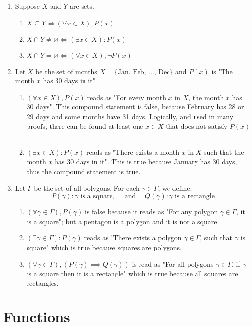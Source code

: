 \begin{example}

    \begin{enumerate}
        \item Suppose $X$ and $Y$ are sets.
            \begin{enumerate}[label=(\alph*)]
                \item $X \subseteq Y \iff (\forall x \in X), P(x)$
                \item $X \cap Y \neq \varnothing \iff (\exists x \in X): P(x)$
                \item $X \cap Y = \varnothing  \iff (\forall x \in X), \neg P(x)$
            \end{enumerate}
        \item Let $X$ be the set of months $X = \{\text{Jan, Feb, ..., Dec}\}$ and $P(x)$ is "The month $x$ has 30 days in it"
            \begin{enumerate}[label=(\alph*)]
                \item $(\forall x \in X), P(x)$ reads as "For every month $x$ in $X$, the month $x$ has 30 days". This compound statement is false, because February has 28 or 29 days and some months have 31 days. Logically, and used in many proofs, there can be found at least one $x \in X$ that does not satisfy $P(x)$.
                \item $(\exists x \in X): P(x)$ reads as "There exists a month $x$ in $X$ such that the month $x$ has 30 days in it". This is true because January has 30 days, thus the compound statement is true.
            \end{enumerate}
        \item Let $\Gamma$ be the set of all polygons. For each $\gamma \in \Gamma$, we define:
        $$
        P(\gamma): \gamma \text{ is a square}, \quad \text{ and } \quad Q(\gamma): \gamma \text{ is a rectangle}
        $$

        \begin{enumerate}[label=(\alph*)]
            \item $(\forall \gamma \in \Gamma), P(\gamma)$ is false because it reads as "For any polygon $\gamma \in \Gamma$, it is a square"; but a pentagon is a polygon and it is not a square.
            \item $(\exists \gamma \in \Gamma) : P(\gamma)$ reads as "There exists a polygon $\gamma \in \Gamma$, such that $\gamma$ is square" which is true because squares are polygons.
            \item $(\forall \gamma \in \Gamma), (P(\gamma) \implies Q(\gamma))$ is read as "For all polygons $\gamma \in \Gamma$, if $\gamma$ is a square then it is a rectangle" which is true because all squares are rectangles.
        \end{enumerate}
    \end{enumerate}
\end{example}

\section{Functions}
